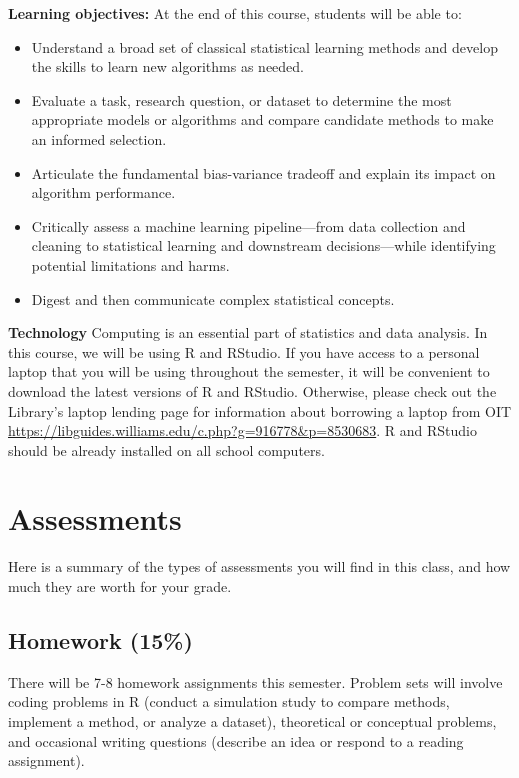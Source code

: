 \documentclass[11pt]{article}
\begin{document}
\begin{list}{}{}
\item[\textbf{Learning objectives:}] At the end of this course, students will be able to: 
\begin{itemize}
\item Understand a broad set of classical statistical learning methods and develop the skills to learn new algorithms as needed.
\item Evaluate a task, research question, or dataset to determine the most appropriate models or algorithms and compare candidate methods to make an informed selection.
\item Articulate the fundamental bias-variance tradeoff and explain its impact on algorithm performance.
\item Critically assess a machine learning pipeline—from data collection and cleaning to statistical learning and downstream decisions—while identifying potential limitations and harms.
\item Digest and then communicate complex statistical concepts. 
\end{itemize}
\item[\textbf{Technology}] Computing is an essential part of statistics and data analysis. In this course, we will be using R and RStudio. If you have access to a personal laptop that you will be using throughout the semester, it will be convenient to download the latest versions of R and RStudio. Otherwise, please check out the Library's laptop lending page for information about borrowing a laptop from OIT \url{https://libguides.williams.edu/c.php?g=916778&p=8530683}. R and RStudio should be already installed on all school computers.
\end{list}

\section{Assessments}

Here is a summary of the types of assessments you will find in this class, and how much they are worth for your grade. 

\subsection{Homework (15\%)}

There will be 7-8 homework assignments this semester. Problem sets will involve coding problems in R (conduct a simulation study to compare methods, implement a method, or analyze a dataset), theoretical or conceptual problems, and occasional writing questions (describe an idea or respond to a reading assignment).
\end{document}
